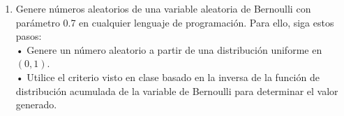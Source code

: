 \documentclass[a4paper, 12pt]{article}
\newcommand{\Pspace}{0.5cm}
\newcommand{\Aspace}{0.2cm}
\begin{document}
\begin{enumerate}
    \vspace{\Pspace}
    \item Genere números aleatorios de una variable aleatoria de Bernoulli con parámetro 0.7 en cualquier lenguaje de programación. Para ello, siga estos pasos:
    \vspace{0.2cm}
    \\ • Genere un número aleatorio a partir de una distribución uniforme en $(0, 1)$.
    \\ • Utilice el criterio visto en clase basado en la inversa de la función de distribución acumulada de la variable de Bernoulli para determinar el valor generado.
    \vspace{\Aspace} \par
    { \color{azul}  }
\end{enumerate}
\end{document}
